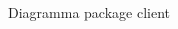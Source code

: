 \begin{adjustwidth}{-3cm}{-3cm}
	\begin{figure}[H]
		\caption{Diagramma package client}
	\end{figure}
\end{adjustwidth}
